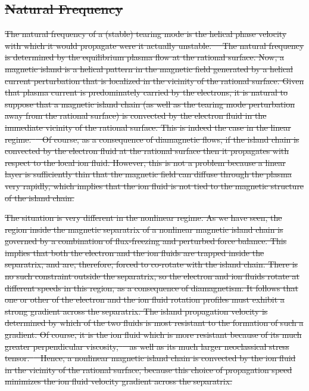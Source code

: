\documentclass[12pt,prb,aps]{revtex4-1}
\providecommand{\DIFdel}[1]{{\protect\color{red}\sout{#1}}}                      %
\begin{document}
\subsection{\DIFdel{Natural Frequency}}%
\addtocounter{subsection}{-1}%
\DIFdel{The natural frequency of a (stable) tearing mode is
the helical phase velocity with which it would propagate
were it actually unstable.\mbox{%
\cite{rfa} }\hspace{0pt}%
The natural frequency
is determined by the equilibrium plasma flow at the
rational surface. Now, a magnetic island is a helical
pattern in the magnetic field  generated by a helical current perturbation that is localized in the
vicinity of the rational surface.
Given that plasma current is predominately carried by the
electrons, it is natural to suppose that a magnetic
island chain (as well as the tearing mode perturbation
away from the rational surface)  is convected by the
electron fluid in the immediate vicinity of the rational
surface. This is indeed the case in the linear regime.\mbox{%
\cite{ara} }\hspace{0pt}%
Of course, as a consequence of diamagnetic flows, if the island chain is
convected by the electron fluid at the rational surface then it propagates with respect to the local ion fluid. However, this is not a
problem because a linear layer is sufficiently thin that the magnetic field can diffuse through the plasma very rapidly, which implies that
the ion fluid is not tied to the magnetic structure of the island chain. 
}%

\DIFdel{The situation is very different in the nonlinear regime. 
As we have seen, the region inside the magnetic separatrix of a nonlinear magnetic island chain is governed by a combination of flux-freezing and perturbed force balance.
This implies that both the electron and the ion fluids are trapped inside the separatrix, and are, therefore,  forced to co-rotate with the island chain. There
is no such constraint outside the separatrix, so the electron and ion fluids rotate at different speeds in this region,
as a consequence of diamagnetism.  It follows that one or other of the electron and the ion fluid rotation profiles must exhibit a strong gradient across
the separatrix. The island propagation velocity is determined by which of the two fluids is most resistant to the formation of such a gradient. 
Of course, it is the ion fluid which is more resistant because of its much greater perpendicular viscosity,\mbox{%
\cite{nl1,wat} }\hspace{0pt}%
as well as its much larger 
neoclassical stress tensor.\mbox{%
\cite{nl2} }\hspace{0pt}%
Hence, a nonlinear magnetic island chain is convected by the ion fluid in the vicinity of the rational
surface, because this choice of propagation speed minimizes the ion fluid velocity gradient across the separatrix.
}%
\end{document}
